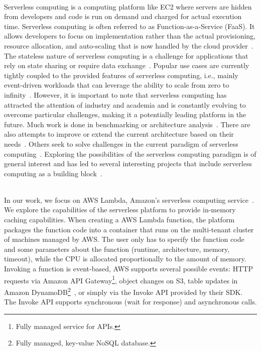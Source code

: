 ~\\
Serverless computing is a computing platform like EC2 where servers are hidden from developers and code is run on demand and charged for actual execution time. Serverless computing is often referred to as Function-as-a-Service (FaaS). It allows developers to focus on implementation rather than the actual provisioning, resource allocation, and auto-scaling that is now handled by the cloud provider~\cite{eismann_serverless_2021}. The stateless nature of serverless computing is a challenge for applications that rely on state sharing or require data exchange~\cite{jonas_cloud_2019, klimovic_pocket_nodate}. Popular use cases are currently tightly coupled to the provided features of serverless computing, i.e., mainly event-driven workloads that can leverage the ability to scale from zero to infinity~\cite{jonas_cloud_2019}. However, it is important to note that serverless computing has attracted the attention of industry and academia and is constantly evolving to overcome particular challenges, making it a potentially leading platform in the future. Much work is done in benchmarking or architecture analysis~\cite{wang_peeking_2018, scheuner_function-as--service_2020}. There are also attempts to improve or extend the current architecture based on their needs~\cite{shahrad_serverless_2020, wawrzoniak_boxer_2021, wang_galleon_2021}. Others seek to solve challenges in the current paradigm of serverless computing~\cite{moyer_punching_2021, klimovic_pocket_nodate}. Exploring the possibilities of the serverless computing paradigm is of general interest and has led to several interesting projects that include serverless computing as a building block~\cite{wang_infinicache_2020, mahgoub_sonic_2021, thomas_particle_2020, noauthor_granular_nodate}.

~\\
In our work, we focus on AWS Lambda, Amazon's serverless computing service~\cite{noauthor_serverless_nodate}. We explore the capabilities of the serverless platform to provide in-memory caching capabilities. When creating a AWS Lambda function, the platform packages the function code into a container that runs on the multi-tenant cluster of machines managed by AWS. The user only has to specify the function code and some parameters about the function (runtime, architecture, memory, timeout), while the CPU is allocated proportionally to the amount of memory. Invoking a function is event-based, AWS supports several possible events: HTTP requests via Amazon API Gateway\footnote{Fully managed service for APIs.}, object changes on S3, table updates in Amazon DynamoDB\footnote{Fully managed, key-value NoSQL database.}~\cite{noauthor_fast_nodate}, or simply via the Invoke API provided by their SDK. The Invoke API supports synchronous (wait for response) and asynchronous calls. 

